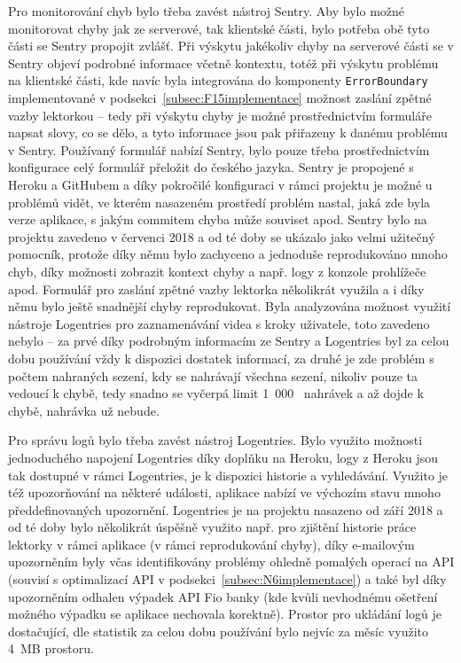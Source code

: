 Pro monitorování chyb bylo třeba zavést nástroj Sentry. Aby bylo možné monitorovat chyby jak ze serverové, tak klientské části, bylo potřeba obě tyto části se Sentry propojit zvlášť. Při výskytu jakékoliv chyby na serverové části se v Sentry objeví podrobné informace včetně kontextu, totéž při výskytu problému na klientské části, kde navíc byla integrována do komponenty \verb|ErrorBoundary| implementované v podsekci~\ref{subsec:F15implementace} možnost zaslání zpětné vazby lektorkou -- tedy při výskytu chyby je možné prostřednictvím formuláře napsat slovy, co se dělo, a tyto informace jsou pak přiřazeny k danému problému v Sentry. Používaný formulář nabízí Sentry, bylo pouze třeba prostřednictvím konfigurace celý formulář přeložit do českého jazyka. Sentry je propojené s Heroku a GitHubem a díky pokročilé konfiguraci v rámci projektu je možné u problémů vidět, ve kterém nasazeném prostředí problém nastal, jaká zde byla verze aplikace, s jakým commitem chyba může souviset apod. Sentry bylo na projektu zavedeno v červenci 2018 a od té doby se ukázalo jako velmi užitečný pomocník, protože díky němu bylo zachyceno a jednoduše reprodukováno mnoho chyb, díky možnosti zobrazit kontext chyby a např. logy z konzole prohlížeče apod. Formulář pro zaslání zpětné vazby lektorka několikrát využila a i díky němu bylo ještě snadnější chyby reprodukovat. Byla analyzována možnost využití nástroje Logentries pro zaznamenávání videa s kroky uživatele, toto zavedeno nebylo -- za prvé díky podrobným informacím ze Sentry a Logentries byl za celou dobu používání vždy k dispozici dostatek informací, za druhé je zde problém s počtem nahraných sezení, kdy se nahrávají všechna sezení, nikoliv pouze ta vedoucí k chybě, tedy snadno se vyčerpá limit 1~000~ nahrávek a až dojde k chybě, nahrávka už nebude.

Pro správu logů bylo třeba zavést nástroj Logentries. Bylo využito možnosti jednoduchého napojení Logentries díky doplňku na Heroku, logy z Heroku jsou tak dostupné v rámci Logentries, je k dispozici historie a vyhledávání. Využito je též upozorňování na některé události, aplikace nabízí ve výchozím stavu mnoho předdefinovaných upozornění. Logentries je na projektu nasazeno od září 2018 a od té doby bylo několikrát úspěšně využito např. pro zjištění historie práce lektorky v rámci aplikace (v rámci reprodukování chyby), díky e-mailovým upozorněním byly včas identifikovány problémy ohledně pomalých operací na API (souvisí s optimalizací API v podsekci~\ref{subsec:N6implementace}) a také byl díky upozorněním odhalen výpadek API Fio banky (kde kvůli nevhodnému ošetření možného výpadku se aplikace nechovala korektně). Prostor pro ukládání logů je dostačující, dle statistik za celou dobu používání bylo nejvíc za měsíc využito 4~MB prostoru.

